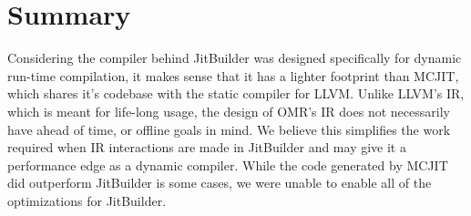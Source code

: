 \section{Summary}
\label{sec:summary}
Considering the compiler behind JitBuilder was designed specifically for dynamic run-time compilation, it makes sense that it has a lighter footprint than MCJIT, which shares it's codebase with the static compiler for LLVM.
Unlike LLVM's IR, which is meant for life-long usage, the design of OMR's IR does not necessarily have ahead of time, or offline goals in mind.
We believe this simplifies the work required when IR interactions are made in JitBuilder and may give it a performance edge as a dynamic compiler.
While the code generated by MCJIT did outperform JitBuilder is some cases, we were unable to enable all of the optimizations for JitBuilder.